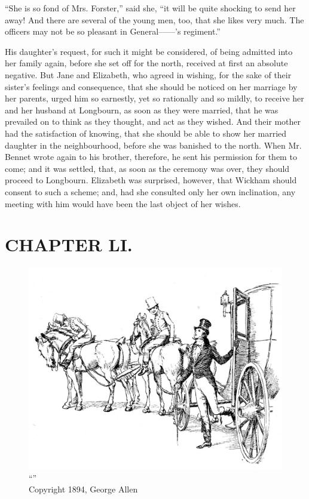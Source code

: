 ``She is so fond of Mrs. Forster,'' said she, ``it will be quite shocking to send her away! And there are several of the young men, too, that she likes very much. The officers may not be so pleasant in General------'s regiment.''

His daughter's request, for such it might be considered, of being admitted into her family again, before she set off for the north, received at first an absolute negative. But Jane and Elizabeth, who agreed in wishing, for the sake of their sister's feelings and consequence, that she should be noticed on her marriage by her parents, urged him so earnestly, yet so rationally and so mildly, to receive her and her husband at Longbourn, as soon as they were married, that he was prevailed on to think as they thought, and act as they wished. And their mother had the satisfaction of knowing, that she should be able to show her married daughter in the neighbourhood, before she was banished to the north. When Mr. Bennet wrote again to his brother, therefore, he sent his permission for them to come; and it was settled, that, as soon as the ceremony was over, they should proceed to Longbourn. Elizabeth was surprised, however, that Wickham should consent to such a scheme; and, had she consulted only her own inclination, any meeting with him would have been the last object of her wishes.



\chapter{CHAPTER LI.}

\begin{figure}[htbp]
    \centering
    \includegraphics[width=\textwidth]{illustrations/i_031.jpg}
    \caption{“”\\ Copyright 1894, George Allen}
    \label{fig:image}
\end{figure}



